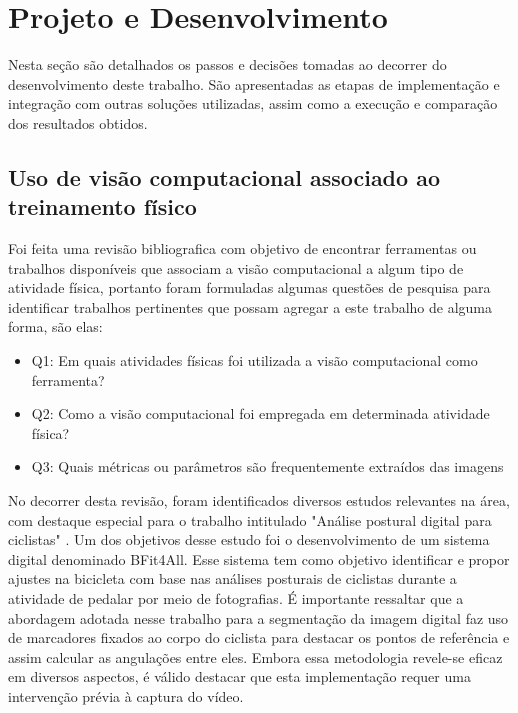 \chapter{Projeto e Desenvolvimento}
Nesta seção são detalhados os passos e decisões tomadas ao decorrer do desenvolvimento deste trabalho. São apresentadas as etapas de implementação e integração com outras soluções utilizadas, assim como a execução e comparação dos resultados obtidos.

\section[Uso de visão computacional associado ao treinamento físico]{Uso de visão computacional associado ao treinamento físico}\label{sec:Uso de visao computacional associado ao treinamento fisico}

Foi feita uma revisão bibliografica com objetivo de encontrar ferramentas ou trabalhos disponíveis que associam a visão computacional a algum tipo de atividade física, portanto foram formuladas algumas questões de pesquisa para identificar trabalhos pertinentes que possam agregar a este trabalho de alguma forma, são elas:
 \begin{itemize}
   \item Q1: Em quais atividades físicas foi utilizada a visão computacional como ferramenta?
   \item Q2: Como a visão computacional foi empregada em determinada atividade física?
   \item Q3: Quais métricas ou parâmetros são frequentemente extraídos das imagens
 \end{itemize}

No decorrer desta revisão, foram identificados diversos estudos relevantes na área, com destaque especial para o trabalho intitulado "Análise postural digital para ciclistas" \cite{vcBicicleta}. Um dos objetivos desse estudo foi o desenvolvimento de um sistema digital denominado BFit4All. Esse sistema tem como objetivo identificar e propor ajustes na bicicleta com base nas análises posturais de ciclistas durante a atividade de pedalar por meio de fotografias. É importante ressaltar que a abordagem adotada nesse trabalho para a segmentação da imagem digital faz uso de marcadores fixados ao corpo do ciclista para destacar os pontos de referência e assim calcular as angulações entre eles. Embora essa metodologia revele-se eficaz em diversos aspectos, é válido destacar que esta implementação requer uma intervenção prévia à captura do vídeo.

